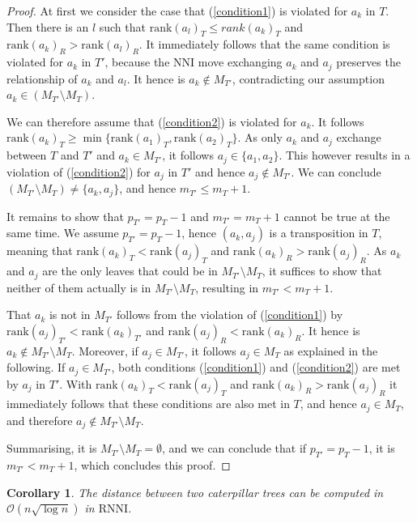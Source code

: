 \documentclass[11pt]{amsart}
\newtheorem{corollary}{Corollary}
\newcommand{\rnni}{\mathrm{RNNI}}
\newcommand{\rank}{\mathrm{rank}}
\newcommand{\nni}{\mathrm{NNI}}
\renewcommand{\O}{\mathcal O}
\begin{document}
\begin{proof}
	At first we consider the case that (\ref{condition1}) is violated for $a_k$ in $T$.
	Then there is an $l$ such that $\rank(a_l)_T \leq rank(a_k)_T$ and $\rank(a_k)_R > \rank(a_l)_R$.
	It immediately follows that the same condition is violated for $a_k$ in $T'$, because the $\nni$ move exchanging $a_k$ and $a_j$ preserves the relationship of $a_k$ and $a_l$.
	It hence is $a_k \notin M_{T'}$, contradicting our assumption $a_k \in (M_{T'} \setminus M_T)$.

	We can therefore assume that (\ref{condition2}) is violated for $a_k$.
	It follows $\rank(a_k)_T \geq \min\{\rank(a_1)_T, \rank(a_2)_T\}$.
	As only $a_k$ and $a_j$ exchange between $T$ and $T'$ and $a_k \in M_{T'}$, it follows $a_j \in \{a_1, a_2\}$.
	This however results in a violation of (\ref{condition2}) for $a_j$ in $T'$ and hence $a_j \notin M_{T'}$.
	We can conclude $(M_{T'} \setminus M_T) \neq \{a_k, a_j\}$, and hence $m_{T'} \leq m_T + 1$.

	It remains to show that $p_{T'} = p_T - 1$ and $m_{T'} = m_T + 1$ cannot be true at the same time.
	We assume $p_{T'} = p_T - 1$, hence $(a_k,a_j)$ is a transposition in $T$, meaning that $\rank(a_k)_T < \rank(a_j)_T$ and $\rank(a_k)_R > \rank(a_j)_R$.
	As $a_k$ and $a_j$ are the only leaves that could be in $M_{T'} \setminus M_T$, it suffices to show that neither of them actually is in $M_{T'} \setminus M_T$, resulting in $m_{T'} < m_T + 1$.

	That $a_k$ is not in $M_{T'}$ follows from the violation of (\ref{condition1}) by $\rank(a_j)_{T'} < \rank(a_k)_{T'}$ and $\rank(a_j)_R < \rank(a_k)_R$.
	It hence is $a_k \notin M_{T'} \setminus M_T$.
	Moreover, if $a_j \in M_{T'}$, it follows $a_j \in M_T$ as explained in the following.
	If $a_j \in M_{T'}$, both conditions (\ref{condition1}) and (\ref{condition2}) are met by $a_j$ in $T'$.
	With $\rank(a_k)_T < \rank(a_j)_T$ and $\rank(a_k)_R > \rank(a_j)_R$ it immediately follows that these conditions are also met in $T$, and hence $a_j \in M_T$, and therefore $a_j \notin M_{T'} \setminus M_T$.

	Summarising, it is $M_{T'} \setminus M_T = \emptyset$, and we can conclude that if $p_{T'} = p_T - 1$, it is $m_{T'} < m_T + 1$, which concludes this proof.
\end{proof}

\begin{corollary}
	The distance between two caterpillar trees can be computed in $\O(n \sqrt{\log n})$ in $\rnni$.
	\label{cor:caterpillar_distance_rnni_nlogn}
\end{corollary}
\end{document}
